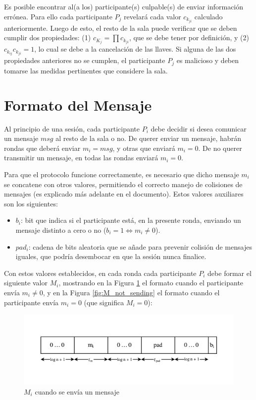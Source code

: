 Es posible encontrar al(a los) participante(s) culpable(s) de enviar información errónea. 
Para ello cada participante $P_j$ revelará cada valor $c_{k_{ji}}$ calculado anteriormente. 
Luego de esto, el resto de la sala puede verificar que se deben cumplir dos propiedades: 
(1) $c_{K_j} = \prod c_{k_{ji}}$, que se debe tener por definición, y 
(2) $c_{k_{ij}} c_{k_{ji}} = 1$, lo cual se debe a la cancelación de las llaves. Si alguna 
de las dos propiedades anteriores no se cumplen, el participante $P_j$ es malicioso y deben 
tomarse las medidas pertinentes que considere la sala.

\section{Formato del Mensaje}

Al principio de una sesión, cada participante $P_i$ debe decidir si desea comunicar 
un mensaje $msg$ al resto de la sala o no. De querer enviar un mensaje, habrán 
rondas que deberá enviar $m_i = msg$, y otras que enviará $m_i = 0$. De no querer 
transmitir un mensaje, en todas las rondas enviará $m_i = 0$. 

Para que el protocolo funcione correctamente, es necesario que dicho mensaje $m_i$ 
se concatene con otros valores, permitiendo el correcto manejo de colisiones de 
mensajes (es explicado más adelante en el documento). Estos valores auxiliares son 
los siguientes:
\begin{itemize}
    \item $b_i$: bit que indica si el participante está, en la presente ronda, 
    enviando un mensaje distinto a cero o no ($b_i = 1 \iff m_i \neq 0$).
    \item $pad_i$: cadena de bits aleatoria que se añade para prevenir colisión 
    de mensajes iguales, que podría desembocar en que la sesión nunca finalice.
\end{itemize}

Con estos valores establecidos, en cada ronda cada participante $P_i$ debe formar 
el siguiente valor $M_i$, mostrando en la Figura \ref{fig:M_sending} el formato cuando 
el participante envía $m_i \neq 0$, y en la Figura \ref{fig:M_not_sending} el formato 
cuando el participante envía $m_i = 0$ (que significa $M_i = 0$):

\begin{figure}[H]
  \centering
    \includegraphics[width=1\textwidth]{imagenes/message-format(1).pdf}
  \caption{$M_i$ cuando se envía un mensaje}
  \label{fig:M_sending}
\end{figure}

